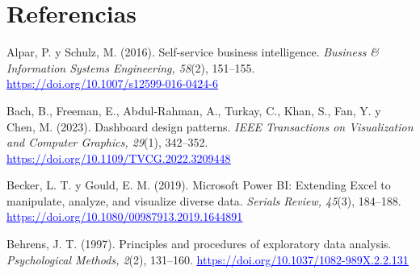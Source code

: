 \documentclass[12pt,a4paper]{article}
\newcommand{\enlace}[2]{\href{#1}{\textcolor{blue}{#2}}}
\begin{document}
\section*{Referencias}
\renewcommand{\refname}{}
\setlength{\bibsep}{6pt}
\setlength{\bibhang}{1.27cm}
\vspace{-1.2cm}
\begin{thebibliography}{99}\small
{}
Alpar, P. y Schulz, M. (2016). Self-service business intelligence. \emph{Business \& Information Systems
Engineering, 58}(2), 151--155. \enlace{https://doi.org/10.1007/s12599-016-0424-6}{\uline{https:/}\allowbreak \uline{/}\allowbreak \uline{doi.}\allowbreak \uline{org/}\allowbreak \uline{10.}\allowbreak \uline{1007/}\allowbreak \uline{s12599-}\allowbreak \uline{016-}\allowbreak \uline{0424-}\allowbreak \uline{6}}

Bach, B., Freeman, E., Abdul-Rahman, A., Turkay, C., Khan, S., Fan, Y. y Chen, M. (2023). Dashboard design
patterns. \emph{IEEE Transactions on Visualization and Computer Graphics, 29}(1), 342--352.
\enlace{https://doi.org/10.1109/TVCG.2022.3209448}{\uline{https:/}\allowbreak \uline{/}\allowbreak \uline{doi.}\allowbreak \uline{org/}\allowbreak \uline{10.}\allowbreak \uline{1109/}\allowbreak \uline{TVCG.}\allowbreak \uline{2022.}\allowbreak \uline{3209448}}

Becker, L. T. y Gould, E. M. (2019). Microsoft Power BI: Extending Excel to manipulate, analyze, and
visualize diverse data. \emph{Serials Review, 45}(3), 184--188.
\enlace{https://doi.org/10.1080/00987913.2019.1644891}{\uline{https:/}\allowbreak \uline{/}\allowbreak \uline{doi.}\allowbreak \uline{org/}\allowbreak \uline{10.}\allowbreak \uline{1080/}\allowbreak \uline{00987913.}\allowbreak \uline{2019.}\allowbreak \uline{1644891}}

Behrens, J. T. (1997). Principles and procedures of exploratory data analysis. \emph{Psychological
Methods, 2}(2), 131--160. \enlace{https://doi.org/10.1037/1082-989X.2.2.131}{\uline{https:/}\allowbreak \uline{/}\allowbreak \uline{doi.}\allowbreak \uline{org/}\allowbreak \uline{10.}\allowbreak \uline{1037/}\allowbreak \uline{1082-}\allowbreak \uline{989X.}\allowbreak \uline{2.}\allowbreak \uline{2.}\allowbreak \uline{131}}


\end{thebibliography}
\end{document}
